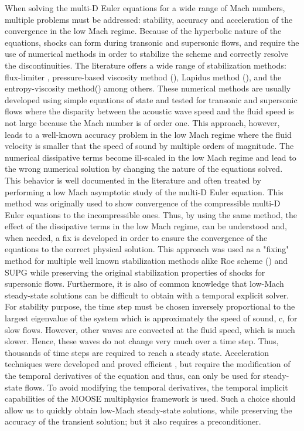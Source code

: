 When solving the multi-D Euler equations for a wide range of Mach numbers, multiple problems must be addressed: stability, accuracy and acceleration of the convergence in the low Mach regime. Because of the hyperbolic nature of the equations, shocks can form during transonic and supersonic flows, and require the use of numerical methods in order to stabilize the scheme and correctly resolve the discontinuities. The literature offers a wide range of stabilization methods: flux-limiter \cite{FluxLimiter, FluxLimiter2}, pressure-based viscosity method (\cite{PBV_book}), Lapidus method (\cite{Lapidus_paper, LMP, Lapidus_book}), and the entropy-viscosity method(\cite{jlg1, jlg2}) among others. These numerical methods are usually developed using simple equations of state and tested for transonic and supersonic flows where the disparity between the acoustic wave speed and the fluid speed is not large because the Mach number is of order one. This approach, however, leads to a well-known accuracy problem in the low Mach regime where the fluid velocity is smaller that the speed of sound by multiple orders of magnitude. The numerical dissipative terms become ill-scaled in the low Mach regime and lead to the wrong numerical solution by changing the nature of the equations solved. This behavior is well documented in the literature \cite{LowMach1, LowMach2, LowMach3} and often treated by performing a low Mach asymptotic study of the multi-D Euler equation. This method was originally used \cite{LowMach1} to show convergence of the compressible multi-D Euler equations to the incompressible ones. Thus, by using the same method, the effect of the dissipative terms in the low Mach regime, can be understood and, when needed, a fix is developed in order to ensure the convergence of the equations to the correct physical solution. This approach was used as a "fixing" method for multiple well known stabilization methods alike Roe scheme (\cite{Roe}) and SUPG \cite{LowMach3} while preserving the original stabilization properties of shocks for supersonic flows. Furthermore, it is also of common knowledge that low-Mach steady-state solutions can be difficult to obtain with a temporal explicit solver. For stability purpose, the time step must be chosen inversely proportional to the largest eigenvalue of the system which is approximately the speed of sound, c, for slow flows. However, other waves are convected at the fluid speed, which is much slower. Hence, these waves do not change very much over a time step. Thus, thousands of time steps are required to reach a steady state. Acceleration techniques were developed and proved efficient \cite{LowMach2}, but require the modification of the temporal derivatives of the equation and thus, can only be used for steady-state flows. To avoid modifying the temporal derivatives, the temporal implicit capabilities of the MOOSE multiphysics framework \cite{Moose} is used. Such a choice should allow us to quickly obtain low-Mach steady-state solutions, while preserving the accuracy of the transient solution; but it also requires a preconditioner.\\
